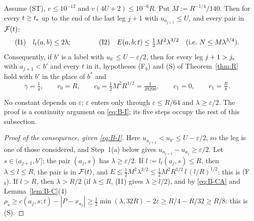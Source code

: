 \begin{theorem}[B: bulk]\label{thm:Bulk}
Assume \textup{(ST)}, $v\le10^{-12}$ and $v(4U+2)\le10^{-6}R$. Put $M:=R^{-1/4}/140$. Then for every $t\ge t_{\mathrm s}$ up to the end of the
last leg $j+1$ with $u_{a_{j+1}}\le U$, and every pair in $\mathcal F(t)$:
\begin{equation}\label{eq:B-I}
\textup{(I1)}\quad l_t(a,b)\le2\lambda;\qquad\qquad\textup{(I2)}\quad E(a,b;t)\le\tfrac12M^2\lambda^{3/2}\quad(\text{i.e.\ }N\le M\lambda^{3/4}).
\end{equation}
Consequently, if $b'$ is a label with $u_{b'}\le U-\varepsilon/2$, then for every leg $j+1>j_{\mathrm s}$ with $a_{j+1}<b'$ and every $t$ in it,
hypotheses \textup{(F$_b$)} and \textup{(S)} of Theorem~\ref{thm:R} hold with $b'$ in the place of $b^*$ and
\[
\gamma=\tfrac14,\qquad r_0=R,\qquad c_0=\tfrac12M^2R^{1/2}=\tfrac1{39200},\qquad c_1=0,\qquad r_1=\tfrac R8 .
\]
\end{theorem}

No constant depends on $\varepsilon$; $\varepsilon$ enters only through $\varepsilon\le R/64$ and $\lambda\ge\varepsilon/2$. The proof
is a continuity argument on \eqref{eq:B-I}; its five steps occupy the rest of this subsection.

\begin{proof}[Proof of the consequence, given \eqref{eq:B-I}]
Here $u_{a_{j+1}}<u_{b'}\le U-\varepsilon/2$, so the leg is one of those considered, and Step~1(a) below gives
$u_{a_{j+1}}-u_{a_j}\ge\varepsilon/2$. Let $s\in(a_{j+1},b']$; the pair $(a_j,s)$ has $\lambda\ge\varepsilon/2$. If
$l:=l_t(a_j,s)\le R$, then $\lambda\le l\le R$, the pair is in $\mathcal F(t)$, and
$E\le\frac12M^2\lambda^{3/2}\le\frac12M^2R^{1/2}\,l\,(l/R)^{1/2}$: this is \textup{(F$_b$)}. If $l>R$, then $\lambda>R/2$ (if
$\lambda\le R$, (I1) gives $\lambda\ge l/2$), and by \eqref{eq:B-CA} and Lemma~\ref{lem:B-C}(4)
$\rho_s\ge c(a_j,s;t)-|P-x_{a_j}|\ge\frac12\min(\lambda,32R)-2\varepsilon\ge R/4-R/32\ge R/8$: this is \textup{(S)}.
\end{proof}


